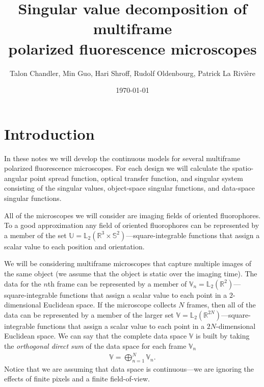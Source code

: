 \documentclass[11pt]{article}
\providecommand{\mbb}[1]{\mathbb{#1}}
\begin{document}
\title{\vspace{-2.5em} Singular value decomposition of multiframe\\ polarized
  fluorescence microscopes\vspace{-1em}} \author{Talon Chandler, Min Guo, Hari
  Shroff, Rudolf Oldenbourg, Patrick La Rivi\`ere}
\date{\vspace{-1em}\today\vspace{-1em}}
\maketitle
\section{Introduction}
In these notes we will develop the continuous models for several multiframe
polarized fluorescence microscopes. For each design we will calculate the
spatio-angular point spread function, optical transfer function, and singular
system consisting of the singular values, object-space singular functions, and
data-space singular functions.

All of the microscopes we will consider are imaging fields of oriented
fluorophores. To a good approximation any field of oriented fluorophores can be
represented by a member of the set
$\mbb{U} = \mbb{L}_2(\mbb{R}^3 \times \mbb{S}^2)$---square-integrable functions
that assign a scalar value to each position and orientation.

We will be considering multiframe microscopes that capture multiple images of
the same object (we assume that the object is static over the imaging time). The
data for the $n$th frame can be represented by a member of
$\mbb{V}_n = \mbb{L}_2(\mbb{R}^{2})$---square-integrable functions that assign a
scalar value to each point in a $2$-dimensional Euclidean space. If the
microscope collects $N$ frames, then all of the data can be represented by a
member of the larger set $\mbb{V} = \mbb{L}_2(\mbb{R}^{2N})$---square-integrable
functions that assign a scalar value to each point in a $2N$-dimensional
Euclidean space. We can say that the complete data space $\mbb{V}$ is built by
taking the \textit{orthogonal direct sum} of the data space for each frame
$\mbb{V}_n$
\begin{align}
  \mbb{V} = \bigoplus_{n=1}^N \mbb{V}_n.
\end{align}
Notice that we are assuming that data space is continuous---we are ignoring the
effects of finite pixels and a finite field-of-view.
\end{document}
